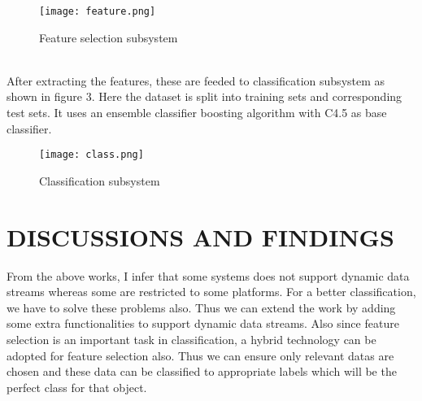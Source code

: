 \documentclass[10pt,a4paper,journal]{IEEEtran}
\begin{document}
\begin{figure}
\hbox{\texttt{[image: feature.png]}}
\caption{Feature selection subsystem}
\end{figure}\\
After extracting the features,  these are feeded to classification subsystem as shown in figure 3. Here the dataset is split into training sets and corresponding test sets. It uses an ensemble classifier boosting\cite{14} algorithm with C4.5 as base classifier. 
\begin{figure}
\hbox{\texttt{[image: class.png]}}
\caption{Classification subsystem}
\end{figure}

\section{DISCUSSIONS AND FINDINGS}
From the above works, I infer that some systems does not support dynamic data streams whereas some are restricted to some platforms. For a better classification, we have to solve these problems also. Thus we can extend the work by adding some extra functionalities to support dynamic data streams. Also since feature selection is an important task in classification, a hybrid technology can be adopted for feature selection also. Thus we can ensure only relevant datas are chosen and these data can be classified to appropriate labels which will be the perfect class for that object.\\
 
\end{document}
